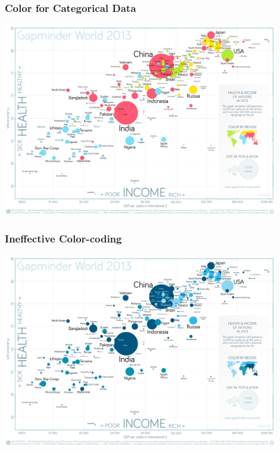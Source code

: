 \documentclass[hyperref={bookmarks=false}]{beamer}
\begin{document}

\begin{frame}
\frametitle{Color for Categorical Data}

\center\includegraphics[width = 0.9\textwidth]{./fig/gapminder_world_2013.pdf}


\end{frame}


\begin{frame}
\frametitle{Ineffective Color-coding}

\center\includegraphics[width = 0.9\textwidth]{./fig/gapminder_world_2013_mono.pdf}


\end{frame}
\end{document}
